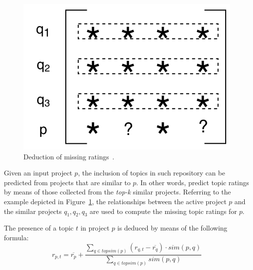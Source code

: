 \begin{figure}[t!]
\centering
\includegraphics[width=0.55\linewidth]{figs/matrix.pdf}
\vspace{-.4cm}
\caption{Deduction of missing ratings~\cite{Zhao:2010:UCR:1748610.1749278}.}%
\vspace{-.1cm}
\label{fig:UserBasedCF}
\end{figure}


Given an input project $p$, the inclusion of topics in such repository can be predicted from projects that are similar to $p$. In other words, \TF predict topic ratings  by means of those collected from the \emph{top-k} similar projects.
Referring to the example depicted in Figure~\ref{fig:UserBasedCF}, 
the relationships between the active project $p$ and the similar projects $q_1,q_2,q_3$ are used to compute the missing topic ratings for $p$. 



The presence of a topic $t$ in project $p$ is deduced by means of the following formula:
\begin{equation} \label{eqn:Prediction}
r_{p,t}=\overline{r_{p}}+\frac{\sum_{q \in topsim(p)}(r_{q,t}-\overline{r_{q}})\cdot sim(p,q) }{\sum_{q \in topsim(p)} sim(p,q) } %
\end{equation}

